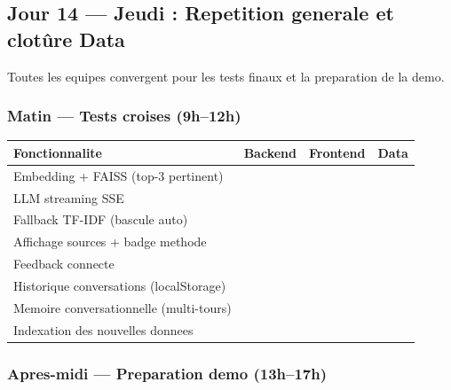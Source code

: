 \documentclass[11pt,a4paper]{article}
\renewcommand{\checkmark}{\ding{52}}
\begin{document}
\subsection{Jour 14 --- Jeudi : Repetition generale et clotûre Data}

Toutes les equipes convergent pour les tests finaux et la preparation de la demo.

\subsubsection*{Matin --- Tests croises (9h--12h)}

\begin{center}
\begin{tabular}{|p{5cm}|c|c|c|}
\hline
\rowcolor{green!15}
\textbf{Fonctionnalite} & \textbf{Backend} & \textbf{Frontend} & \textbf{Data} \\
\hline
Embedding + FAISS (top-3 pertinent) & \checkmark & & \\
\hline
LLM streaming SSE & \checkmark & \checkmark & \\
\hline
Fallback TF-IDF (bascule auto) & \checkmark & \checkmark & \\
\hline
Affichage sources + badge methode & & \checkmark & \\
\hline
Feedback connecte & \checkmark & \checkmark & \\
\hline
Historique conversations (localStorage) & & \checkmark & \\
\hline
Memoire conversationnelle (multi-tours) & \checkmark & \checkmark & \\
\hline
Indexation des nouvelles donnees & \checkmark & & \checkmark \\
\hline
\end{tabular}
\end{center}

\subsubsection*{Apres-midi --- Preparation demo (13h--17h)}
\end{document}
